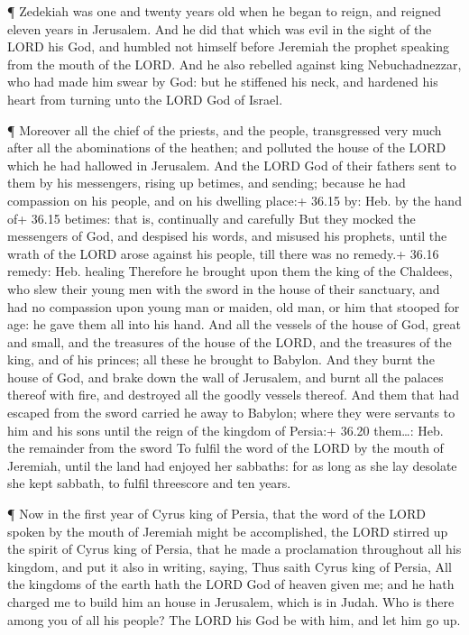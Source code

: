  ¶ Zedekiah was one and twenty years old when he began to
reign, and reigned eleven years in Jerusalem.  And he did
that which was evil in the sight of the LORD his God, and humbled not
himself before Jeremiah the prophet speaking from the mouth of the LORD.
 And he also rebelled against king Nebuchadnezzar, who had
made him swear by God: but he stiffened his neck, and hardened his heart
from turning unto the LORD God of Israel.

 ¶ Moreover all the chief of the priests, and the people,
transgressed very much after all the abominations of the heathen; and
polluted the house of the LORD which he had hallowed in Jerusalem.
 And the LORD God of their fathers sent to them by his
messengers, rising up betimes, and sending; because he had compassion on
his people, and on his dwelling place:+ 36.15 by: Heb. by the hand of+
36.15 betimes: that is, continually and carefully  But they
mocked the messengers of God, and despised his words, and misused his
prophets, until the wrath of the LORD arose against his people, till
there was no remedy.+ 36.16 remedy: Heb. healing  Therefore
he brought upon them the king of the Chaldees, who slew their young men
with the sword in the house of their sanctuary, and had no compassion
upon young man or maiden, old man, or him that stooped for age: he gave
them all into his hand.  And all the vessels of the house
of God, great and small, and the treasures of the house of the LORD, and
the treasures of the king, and of his princes; all these he brought to
Babylon.  And they burnt the house of God, and brake down
the wall of Jerusalem, and burnt all the palaces thereof with fire, and
destroyed all the goodly vessels thereof.  And them that
had escaped from the sword carried he away to Babylon; where they were
servants to him and his sons until the reign of the kingdom of Persia:+
36.20 them\ldots: Heb. the remainder from the sword  To
fulfil the word of the LORD by the mouth of Jeremiah, until the land had
enjoyed her sabbaths: for as long as she lay desolate she kept sabbath,
to fulfil threescore and ten years.

 ¶ Now in the first year of Cyrus king of Persia, that the
word of the LORD spoken by the mouth of Jeremiah might be accomplished,
the LORD stirred up the spirit of Cyrus king of Persia, that he made a
proclamation throughout all his kingdom, and put it also in writing,
saying,  Thus saith Cyrus king of Persia, All the kingdoms
of the earth hath the LORD God of heaven given me; and he hath charged
me to build him an house in Jerusalem, which is in Judah. Who is there
among you of all his people? The LORD his God be with him, and let him
go up.
